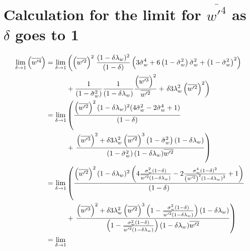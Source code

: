 \section{Calculation for the limit for \texorpdfstring{$\overline{w'^4}$}{wprime4bar} as \texorpdfstring{$\delta$}{delta} goes to 1}
\label{sec:calculation-for-the-limit-for-wprime4bar-as-delta-goes-to-1}

{\allowdisplaybreaks
    \begin{align}
        \label{eq:limit_wprime4_delta_to_1_calc}
        \lim_{\delta \to 1}\left(\overline{w'^4}\right)
        = \lim_{\delta \to 1}
        &\left(\left(\wptwo\right)^2\right.
        \frac{(1-\delta \lambda_w)^2}{(1-\delta)}
        \left(3 \tilde{\sigma}_w^4 + 6 \tswfact \tilde{\sigma}_w^2 + \tswfact^2\right) \nonumber\\
        &+ \frac{1}{\tswfact} \frac{1}{(1-\delta \lambda_w)}
        \frac{\left(\overline{w'^3}\right)^2}{\wptwo}
        + \left.\delta 3 \lambda_w^2 \left(\wptwo\right)^2\right) \\
        = \lim_{\delta \to 1}
        &\left(
        \frac{
            \left(\wptwo\right)^2 (1-\delta \lambda_w)^2
            (4 \tilde{\sigma}_w^2 - 2 \tilde{\sigma}_w^4 + 1)
        }
        {(1-\delta)}
        \right.
        \nonumber\\
        &+ \left.
        \frac{
            \left(\overline{w'^3}\right)^2 +
            \delta 3 \lambda_w^2 \left(\wptwo\right)^3 \tswfact (1-\delta \lambda_w)
        }
        {
            \tswfact (1-\delta \lambda_w) \wptwo
        }
        \right)
        \\
        = \lim_{\delta \to 1}
        &\left(
        \frac{
            \left(\wptwo\right)^2 (1-\delta \lambda_w)^2
            \left(4 \frac{\sigma_w^2 (1-\delta)}{\wptwo(1-\delta\lambda_w)} -
            2 \frac{\sigma_w^4 (1-\delta)^2}{\left(\wptwo\right)^2 \left(1-\delta\lambda_w\right)^2} +
            1\right)
        }
        {(1-\delta)}
        \right.
        \nonumber\\
        &+ \left.
        \frac{
            \left(\overline{w'^3}\right)^2 +
            \delta 3 \lambda_w^2 \left(\wptwo\right)^3
            \left(1-\frac{\sigma_w^2 (1-\delta)}{\wptwo(1-\delta\lambda_w)}\right)
            (1-\delta \lambda_w)
        }
        {
            \left(1 - \frac{\sigma_w^2 (1-\delta)}{\wptwo(1-\delta\lambda_w)}\right)
            (1-\delta \lambda_w)
            \wptwo
        }
        \right)
        \\
        = \lim_{\delta \to 1}

\end{align}}
